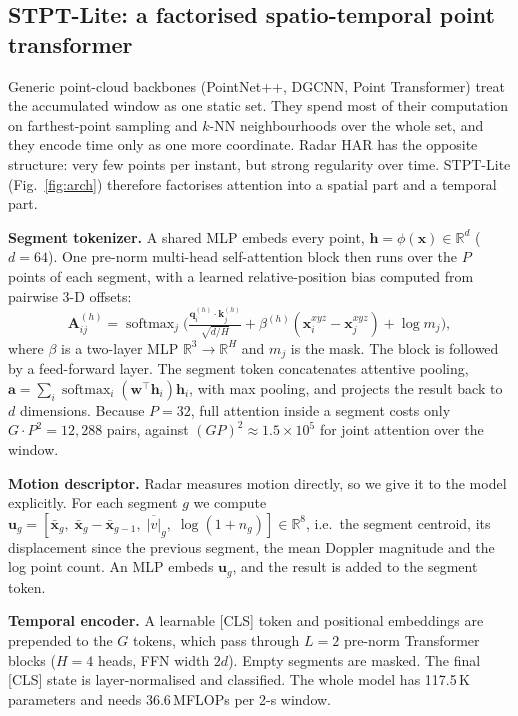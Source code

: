 \subsection{STPT-Lite: a factorised spatio-temporal point transformer}
Generic point-cloud backbones (PointNet++, DGCNN, Point Transformer) treat the
accumulated window as one static set. They spend most of their computation on
farthest-point sampling and $k$-NN neighbourhoods over the whole set, and they
encode time only as one more coordinate. Radar HAR has the opposite structure:
very few points per instant, but strong regularity over time. STPT-Lite
(Fig.~\ref{fig:arch}) therefore factorises attention into a spatial part and a
temporal part.

\textbf{Segment tokenizer.} A shared MLP embeds every point,
$\mathbf{h}=\phi(\mathbf{x})\in\mathbb{R}^{d}$ ($d=64$). One pre-norm
multi-head self-attention block then runs over the $P$ points of each segment,
with a learned relative-position bias computed from pairwise 3-D offsets:
\begin{equation}
\mathbf{A}^{(h)}_{ij}=\operatorname{softmax}_j\!\Big(\tfrac{\mathbf{q}_i^{(h)}\cdot\mathbf{k}_j^{(h)}}{\sqrt{d/H}}+\beta^{(h)}(\mathbf{x}_i^{xyz}-\mathbf{x}_j^{xyz})+\log m_j\Big),
\end{equation}
where $\beta$ is a two-layer MLP $\mathbb{R}^3\!\to\!\mathbb{R}^{H}$ and $m_j$
is the mask. The block is followed by a feed-forward layer. The segment token
concatenates attentive pooling,
$\mathbf{a}=\sum_i\operatorname{softmax}_i(\mathbf{w}^\top\mathbf{h}_i)\mathbf{h}_i$,
with max pooling, and projects the result back to $d$ dimensions. Because $P=32$,
full attention inside a segment costs only $G\cdot P^2=12{,}288$ pairs, against
$(GP)^2\approx1.5\times10^5$ for joint attention over the window.

\textbf{Motion descriptor.} Radar measures motion directly, so we give it to the
model explicitly. For each segment $g$ we compute
$\mathbf{u}_g=[\bar{\mathbf{x}}_g,\;\bar{\mathbf{x}}_g-\bar{\mathbf{x}}_{g-1},\;\overline{|v|}_g,\;\log(1+n_g)]\in\mathbb{R}^8$,
i.e.\ the segment centroid, its displacement since the previous segment, the
mean Doppler magnitude and the log point count. An MLP embeds $\mathbf{u}_g$,
and the result is added to the segment token.

\textbf{Temporal encoder.} A learnable [CLS] token and positional embeddings are
prepended to the $G$ tokens, which pass through $L=2$ pre-norm Transformer blocks
\cite{vaswani2017attention} ($H=4$ heads, FFN width $2d$). Empty segments are
masked. The final [CLS] state is layer-normalised and classified. The whole model
has 117.5\,K parameters and needs 36.6\,MFLOPs per 2-s window.


